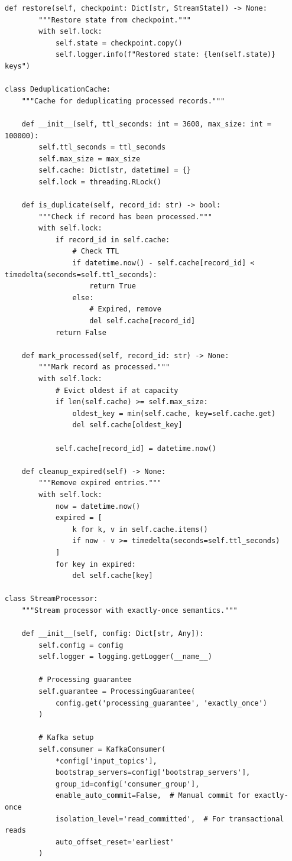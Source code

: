 \begin{lstlisting}[style=python, caption=StreamProcessor with Exactly-Once Guarantees]
    def restore(self, checkpoint: Dict[str, StreamState]) -> None:
        """Restore state from checkpoint."""
        with self.lock:
            self.state = checkpoint.copy()
            self.logger.info(f"Restored state: {len(self.state)} keys")

class DeduplicationCache:
    """Cache for deduplicating processed records."""

    def __init__(self, ttl_seconds: int = 3600, max_size: int = 100000):
        self.ttl_seconds = ttl_seconds
        self.max_size = max_size
        self.cache: Dict[str, datetime] = {}
        self.lock = threading.RLock()

    def is_duplicate(self, record_id: str) -> bool:
        """Check if record has been processed."""
        with self.lock:
            if record_id in self.cache:
                # Check TTL
                if datetime.now() - self.cache[record_id] < timedelta(seconds=self.ttl_seconds):
                    return True
                else:
                    # Expired, remove
                    del self.cache[record_id]
            return False

    def mark_processed(self, record_id: str) -> None:
        """Mark record as processed."""
        with self.lock:
            # Evict oldest if at capacity
            if len(self.cache) >= self.max_size:
                oldest_key = min(self.cache, key=self.cache.get)
                del self.cache[oldest_key]

            self.cache[record_id] = datetime.now()

    def cleanup_expired(self) -> None:
        """Remove expired entries."""
        with self.lock:
            now = datetime.now()
            expired = [
                k for k, v in self.cache.items()
                if now - v >= timedelta(seconds=self.ttl_seconds)
            ]
            for key in expired:
                del self.cache[key]

class StreamProcessor:
    """Stream processor with exactly-once semantics."""

    def __init__(self, config: Dict[str, Any]):
        self.config = config
        self.logger = logging.getLogger(__name__)

        # Processing guarantee
        self.guarantee = ProcessingGuarantee(
            config.get('processing_guarantee', 'exactly_once')
        )

        # Kafka setup
        self.consumer = KafkaConsumer(
            *config['input_topics'],
            bootstrap_servers=config['bootstrap_servers'],
            group_id=config['consumer_group'],
            enable_auto_commit=False,  # Manual commit for exactly-once
            isolation_level='read_committed',  # For transactional reads
            auto_offset_reset='earliest'
        )


\end{lstlisting}
